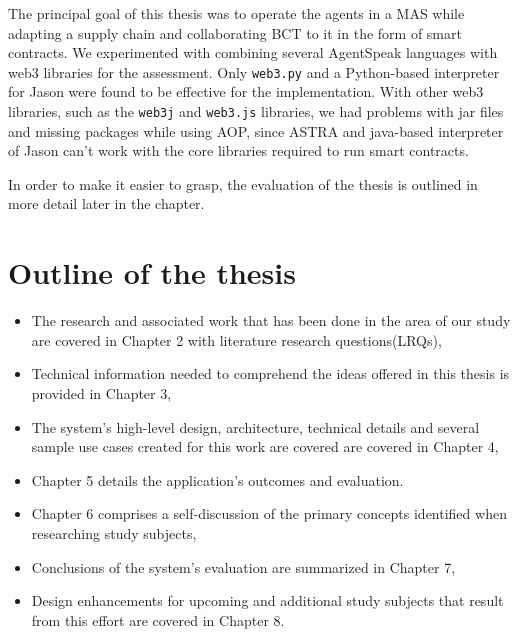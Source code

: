 The principal goal of this thesis was to operate the agents in a \ac{MAS} while adapting a supply chain and collaborating \ac{BCT} to it in the form of smart contracts. We experimented with combining several AgentSpeak languages with web3 libraries for the assessment. Only \texttt{web3.py} and a Python-based interpreter for Jason were found to be effective for the implementation. With other web3 libraries, such as the \texttt{web3j} and \texttt{web3.js} libraries, we had problems with jar files and missing packages while using \ac{AOP}, since ASTRA and java-based interpreter of Jason can't work with the core libraries required to run smart contracts.

 \vspace{.5cm}
 
In order to make it easier to grasp, the evaluation of the thesis is outlined in more detail later in the chapter.

\section{Outline of the thesis}
\begin{itemize}
    \item The research and associated work that has been done in the area of our study are covered in Chapter 2 with literature research questions(LRQs),
    
\vspace{.5cm}

    \item Technical information needed to comprehend the ideas offered in this thesis is provided in Chapter 3,
    
\vspace{.5cm}

    \item The system's high-level design, architecture, technical details and several sample use cases created for this work are covered  are covered in Chapter 4,
    
\vspace{.5cm}

    \item Chapter 5 details the application's outcomes and evaluation.
    
\vspace{.5cm}

    \item Chapter 6 comprises a self-discussion of the primary concepts identified when researching study subjects,

\vspace{.5cm}

    \item Conclusions of the system's evaluation are summarized in Chapter 7,

\vspace{.5cm}
  
    \item Design enhancements for upcoming and additional study subjects that result from this effort are covered in Chapter 8.
\end{itemize}


